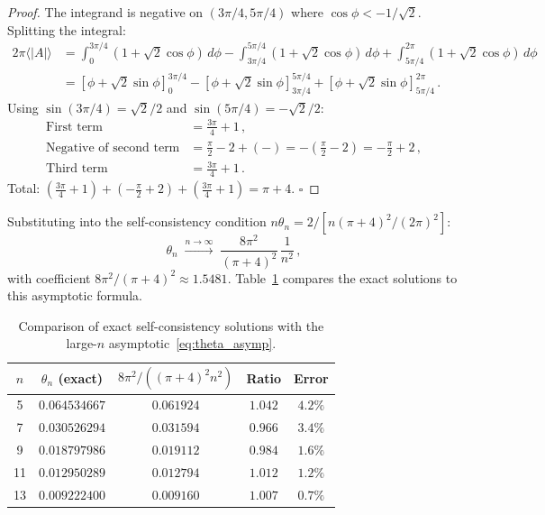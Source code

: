 \documentclass[11pt]{article}
\begin{document}
\begin{proof}
  The integrand is negative on $(3\pi/4, 5\pi/4)$ where
  $\cos\phi < -1/\sqrt{2}$.
  Splitting the integral:
  \begin{align*}
    2\pi\langle|A|\rangle
    &= \int_0^{3\pi/4}(1+\sqrt{2}\cos\phi)\,d\phi
     - \int_{3\pi/4}^{5\pi/4}(1+\sqrt{2}\cos\phi)\,d\phi
     + \int_{5\pi/4}^{2\pi}(1+\sqrt{2}\cos\phi)\,d\phi\\
    &= \left[\phi + \sqrt{2}\sin\phi\right]_0^{3\pi/4}
     - \left[\phi + \sqrt{2}\sin\phi\right]_{3\pi/4}^{5\pi/4}
     + \left[\phi + \sqrt{2}\sin\phi\right]_{5\pi/4}^{2\pi}\,.
  \end{align*}
  Using $\sin(3\pi/4) = \sqrt{2}/2$ and $\sin(5\pi/4) = -\sqrt{2}/2$:
  \begin{align*}
    \text{First term} &= \tfrac{3\pi}{4} + 1\,,\\
    \text{Negative of second term} &= \tfrac{\pi}{2} - 2 + (-) = -(\tfrac{\pi}{2} - 2) = -\tfrac{\pi}{2}+2\,,\\
    \text{Third term} &= \tfrac{3\pi}{4} + 1\,.
  \end{align*}
  Total: $(\tfrac{3\pi}{4}+1) + (-\tfrac{\pi}{2}+2) + (\tfrac{3\pi}{4}+1) = \pi + 4$. \qquad\qquad $\square$
\end{proof}

Substituting into the self-consistency condition
$n\theta_n = 2/[n(\pi+4)^2/(2\pi)^2]$:
\begin{equation}
  \theta_n \;\xrightarrow{n\to\infty}\; \frac{8\pi^2}{(\pi+4)^2}\,\frac{1}{n^2}\,,
  \label{eq:theta_asymp}
\end{equation}
with coefficient $8\pi^2/(\pi+4)^2 \approx 1.5481$.
Table~\ref{tab:asymp} compares the exact solutions to this asymptotic formula.

\begin{table}[ht]
  \caption{Comparison of exact self-consistency solutions with the
    large-$n$ asymptotic~\protect\eqref{eq:theta_asymp}.}
  \label{tab:asymp}
  \begin{tabular}{ccccc}
    \toprule
    $n$ & $\theta_n$ (exact) & $8\pi^2/((\pi+4)^2 n^2)$ & Ratio & Error \\
    \midrule
    5  & $0.064534667$ & $0.061924$ & $1.042$ & $4.2\%$ \\
    7  & $0.030526294$ & $0.031594$ & $0.966$ & $3.4\%$ \\
    9  & $0.018797986$ & $0.019112$ & $0.984$ & $1.6\%$ \\
    11 & $0.012950289$ & $0.012794$ & $1.012$ & $1.2\%$ \\
    13 & $0.009222400$ & $0.009160$ & $1.007$ & $0.7\%$ \\
    \bottomrule
  \end{tabular}
\end{table}
\end{document}
